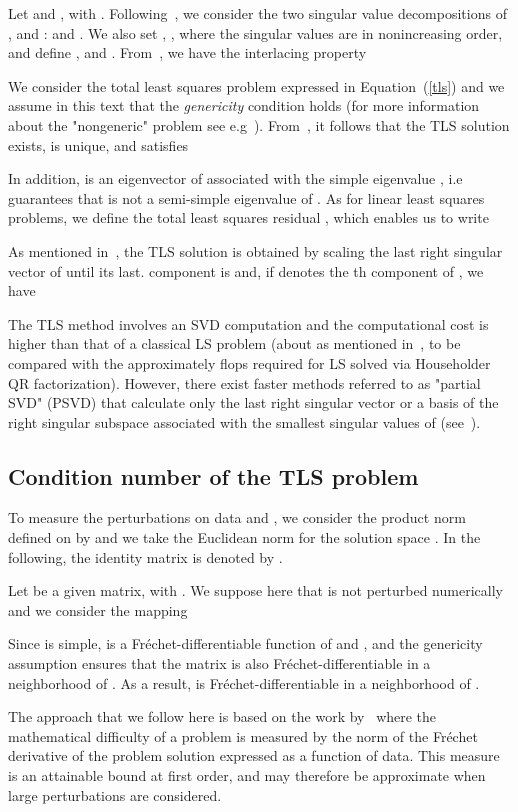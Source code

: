 \documentclass[a4paper]{article}
\begin{document}
Let  and , with .
Following~\cite{vava91}, we consider the two singular value decompositions
of , and  :  and
. We also set ,
,
where the singular values are in nonincreasing order,
and define , and .
From~\cite[p. 178]{BJORCK}, we have the interlacing property

We consider the total least squares problem expressed in Equation~(\ref{tls})
and we assume in this text that the {\em genericity } condition  holds
(for more information about the "nongeneric" problem see e.g~\cite{vava91,CORE}).
From~\cite[Theorems~2.6 and~2.7]{vava91}, it follows that
the TLS solution  exists, is unique, and satisfies

In addition,  is an eigenvector of
 associated with the simple eigenvalue ,
i.e  guarantees that  is not a
semi-simple eigenvalue of . As for linear least squares problems,
we define the total least squares residual
, which enables us to write

As mentioned in~\cite[p. 35]{vava91}, the TLS solution is obtained by scaling the last right singular vector  of
 until its last.
component is  and, if  denotes the th component of , we have

The TLS method involves an SVD computation and the
computational cost is higher than that of a classical LS problem
(about  as mentioned in~\cite[p. 598]{GOLUB},
to be compared with the approximately  flops
required for LS solved via Householder QR factorization). However, there exist faster methods
referred to as "partial SVD" (PSVD) that calculate only the last right singular vector or a basis
of the right singular subspace associated with the smallest singular values of 
(see~\cite[p. 97]{vava91}).
\subsection{Condition number of the TLS problem}
To measure the perturbations on data  and , we consider
the product norm defined on  by  
and we take the Euclidean norm  for the solution space .
In the following, the  identity matrix is denoted by .

Let  be a given  matrix, with . We suppose here that  is not
perturbed numerically and we  consider  the mapping

Since  is simple,  is a Fr\'echet-differentiable
function of  and , and the genericity assumption ensures that
the matrix  is also Fr\'echet-differentiable
in a neighborhood of . As a result,  is Fr\'echet-differentiable
in a neighborhood of .

The approach that we follow here is based on the work by~\cite{geur82,rice.66} where the mathematical difficulty of a problem is measured by the norm of the Fr\'echet derivative of the problem solution expressed as a function of data. This measure is an attainable bound at first order, and may therefore be approximate when large perturbations are considered.
\end{document}
